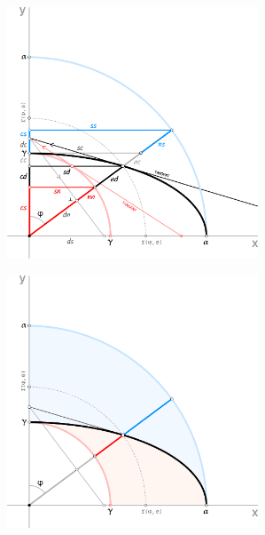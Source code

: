 \documentclass[a4paper,10pt]{article}
\begin{document}
\begin{multicols}{2}
  \noindent
  \begin{minipage}{\linewidth}
    \centering
    \includegraphics[width=75mm]{./img/jacobiSine.png}\vspace{1mm}
    \label{fig:jacobi}
  \end{minipage}
  \noindent
  \begin{minipage}{\linewidth}
    \centering
    \includegraphics[width=75mm]{./img/dualTopology.png}\vspace{1mm}
    \label{fig:dual}
  \end{minipage}
\end{multicols}
\end{document}
